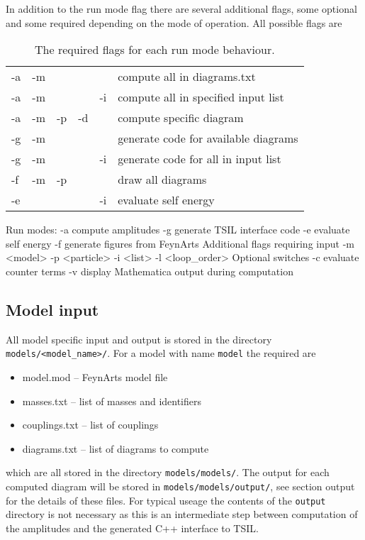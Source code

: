 In addition to the run mode flag there are several additional flags, some optional and some required depending on the mode of operation.  All possible flags are
\begin{table}
\caption{The required flags for each run mode behaviour.}
\begin{tabular}{l c c c c l} 
\hline
-a & -m & & & &compute all in diagrams.txt \\
-a & -m &  && -i&compute all in specified input list\\
-a & -m & -p & -d && compute specific diagram\\
-g & -m & & &  &generate code for available diagrams\\
-g & -m &  & & -i &generate code for all in input list\\
-f & -m & -p & & &draw all diagrams\\
-e &  & & & -i&evaluate self energy\\
\hline\end{tabular}
\end{table}


\begin{lstterm}
Run modes:
-a 		compute amplitudes
-g		generate TSIL interface code
-e		evaluate self energy
-f		generate figures from FeynArts
Additional flags requiring input
-m <model> 
-p <particle>
-i  <list>
-l <loop_order>
Optional switches
-c		evaluate counter terms
-v		display Mathematica output during computation
\end{lstterm}


\subsection{Model input}

All model specific input and output is stored in the directory \lstinline{models/<model_name>/}.  For a model with name \lstinline{model} the required are
\begin{itemize}
\item model.mod  -- FeynArts model file
\item masses.txt -- list of masses and identifiers
\item couplings.txt -- list of couplings
\item diagrams.txt -- list of diagrams to compute
\end{itemize}
which are all stored in the directory \lstinline{models/models/}.  The output for each computed diagram will be stored in \lstinline{models/models/output/}, see section output for the details of these files.  For typical useage the contents of the \lstinline{output} directory is not necessary as this is an intermediate step between computation of the amplitudes and the generated C++ interface to TSIL.

